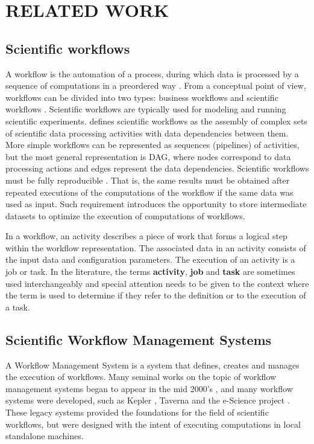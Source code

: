 \chapter{RELATED WORK}
\label{chap:related}
\section{Scientific workflows}
A workflow is the automation of a process, during which data is processed by a sequence of computations in a preordered way \citep{liu2015survey}. From a conceptual point of view, workflows can be divided into two types: business workflows and scientific workflows \citep{hollingsworth1995workflow, taylor2014workflows}. Scientific workflows are typically used for modeling and running scientific experiments. \cite{taylor2014workflows} defines scientific workflows as the assembly of complex sets of scientific data processing activities with data dependencies between them. More simple workflows can be represented as sequences (pipelines) of activities, but the most general representation is DAG, where nodes correspond to data processing actions and edges represent the data dependencies.  Scientific workflows must be fully reproducible \citep{barker2007scientific}. That is, the same results must be obtained after repeated executions of the computations of the workflow if the same data was used as input. Such requirement introduces the opportunity to store intermediate datasets to optimize the execution of computations of workflows.

In a workflow, an activity describes a piece of work that forms a logical step within the workflow representation.  The associated data in an activity consists of the input data and configuration parameters.  The execution of an activity is a job or task. In the literature, the terms \textbf{activity}, \textbf{job} and \textbf{task} are sometimes used interchangeably and special attention needs to be given to the context where the term is used to determine if they refer to the definition or to the execution of a task.
 
\section{Scientific Workflow Management Systems}
A Workflow Management System is a system that defines, creates and manages the execution of workflows. Many seminal works on the topic of workflow management systems began to appear in the mid 2000's \citep[e.g.]{yu2005taxonomy, fox2006special, gil2007examining}, and many workflow systems were developed, such as Kepler \citep{altintas2004kepler}, Taverna \citep{oinn2006taverna} and the e-Science project \citep{deelman2009workflows}. These legacy systems provided the foundations for the field of scientific workflows, but were designed with the intent of executing computations in local standalone machines.

